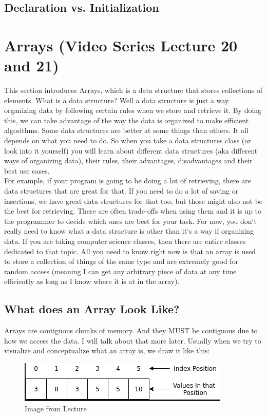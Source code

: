 \documentclass[11]{article}
\begin{document}
\subsection{Declaration vs. Initialization}
\section{Arrays (Video Series Lecture 20 and 21)}
This section introduces Arrays, which is a data structure that stores collections of elements. What is a data structure? Well a data structure is just a way organizing data by following certain rules when we store and retrieve it. By doing this, we can take advantage of the way the data is organized to make efficient algorithms. Some data structures are better at some things than others. It all depends on what you need to do. So when you take a data structures class (or look into it yourself) you will learn about different data structures (aka different ways of organizing data), their rules, their advantages, disadvantages and their best use cases.\\

For example, if your program is going to be doing a lot of retrieving, there are data structures that are great for that. If you need to do a lot of saving or insertions, we have great data structures for that too, but those might also not be the best for retrieving. There are often trade-offs when using them and it is up to the programmer to decide which ones are best for your task. For now, you don`t really need to know what a data structure is other than it`s a way if organizing data. If you are taking computer science classes, then there are entire classes dedicated to that topic. All you need to know right now is that an array is used to store a collection of things of the same type and are extremely good for random access (meaning I can get any arbitrary piece of data at any time efficiently as long as I know where it is at in the array).
\subsection{What does an Array Look Like?}
Arrays are contiguous chunks of memory. And they MUST be contiguous due to how we access the data. I will talk about that more later. Usually when we try to visualize and conceptualize what an array is, we draw it like this:\\

\begin{figure}[H]
	\centering
	\includegraphics[scale=0.5]{arrays1.png}
	\caption{Image from Lecture}
\end{figure}
\end{document}
